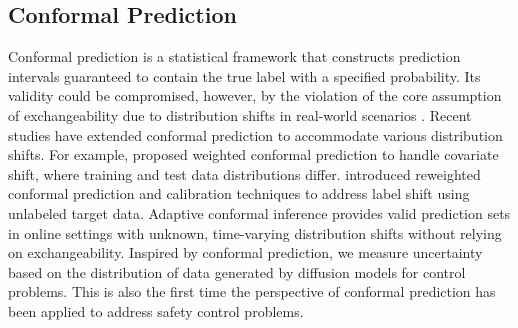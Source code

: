 \subsection{Conformal Prediction}


Conformal prediction \citep{vovk2005algorithmic} is a statistical framework that constructs prediction intervals guaranteed to contain the true label with a specified probability. Its validity could be compromised, however, by the violation of the core assumption of exchangeability due to distribution shifts in real-world scenarios \citep{chernozhukov2018exact, hendrycks2018using}. 
Recent studies \citep{Cauchois2024Robust} have extended conformal prediction to accommodate various distribution shifts. For example, \citet{Tibshirani2019ConformalPU} proposed weighted conformal prediction to handle covariate shift, where training and test data distributions differ. \citet{Podkopaev2021Disfree} introduced reweighted conformal prediction and calibration techniques to address label shift using unlabeled target data. Adaptive conformal inference \citep{gibbs2021adaptive} provides valid prediction sets in online settings with unknown, time-varying distribution shifts without relying on exchangeability. 
Inspired by conformal prediction, we measure uncertainty based on the distribution of data generated by diffusion models for control problems. This is also the first time the perspective of conformal prediction has been applied to address safety control problems.

